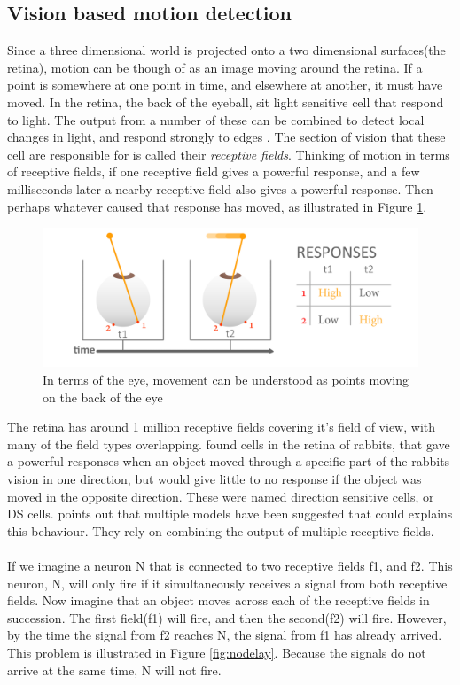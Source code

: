 \documentclass[11pt,a4paper,oneside,table,xcdraw]{article}
\begin{document}
\subsection{Vision based motion detection}
Since a three dimensional world is projected onto a two dimensional surfaces(the retina), motion can be though of as an image moving around the retina. If a point is somewhere at one point in time, and elsewhere at another, it must have moved. In the retina, the back of the eyeball, sit light sensitive cell that respond to light. The output from a number of these can be combined to detect local changes in light, and respond strongly to edges \cite[p. 53]{coursebook}. The section of vision that these cell are responsible for is called their \textit{receptive fields}. Thinking of motion in terms of receptive fields, if one receptive field gives a powerful response, and a few milliseconds later a nearby receptive field also gives a powerful response. Then perhaps whatever caused that response has moved, as illustrated in Figure \ref{fig:overtime}.
\begin{figure}[H]
		\centering
		\includegraphics[width=1\linewidth]{figure/overtime.png}
		\caption{In terms of the eye, movement can be understood as points moving on the back of the eye}
		\label{fig:overtime}
\end{figure}
The retina has around 1 million receptive fields covering it's field of view, with many of the field types overlapping\cite[p. 64-65]{coursebook}. \cite{Barlow1965} found cells in the retina of rabbits, that gave a powerful responses when an object moved through a specific part of the rabbits vision in one direction, but would give little to no response if the object was moved in the opposite direction. These were named direction sensitive cells, or DS cells. \citet{review} points out that multiple models have been suggested that could explains this behaviour. They rely on combining the output of multiple receptive fields.\\\\
If we imagine a neuron N that is connected to two receptive fields f1, and f2. This neuron, N, will only fire if it simultaneously receives a signal from both receptive fields. Now imagine that an object moves across each of the receptive fields in succession. The first field(f1) will fire, and then the second(f2) will fire. However, by the time the signal from f2 reaches N, the signal from f1 has already arrived. This problem is illustrated in Figure \ref{fig:nodelay}. Because the signals do not arrive at the same time, N will not fire.
\end{document}
